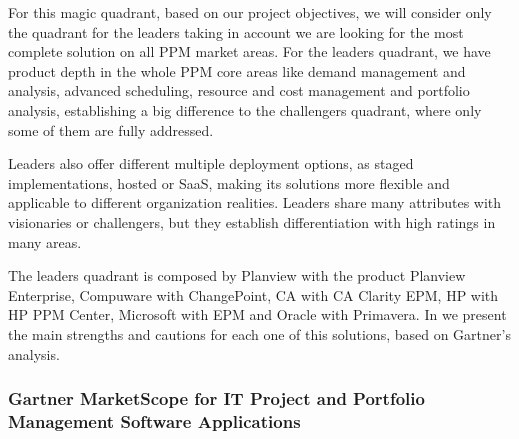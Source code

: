 For this magic quadrant, based on our project objectives, we will consider only the quadrant for the leaders taking in account we are looking for the most complete solution on all PPM market areas. For the leaders quadrant, we have product depth in the whole PPM core areas like demand management and analysis, advanced scheduling, resource and cost management and portfolio analysis, establishing a big difference to the challengers quadrant, where only some of them are fully addressed.\par
Leaders also offer different multiple deployment options, as staged implementations, hosted or SaaS, making its solutions more flexible and applicable to different organization realities. Leaders share many attributes with visionaries or challengers, but they establish differentiation with high ratings in many areas.\par
The leaders quadrant is composed by Planview with the product Planview Enterprise, Compuware with ChangePoint, CA with CA Clarity EPM, HP with HP PPM Center, Microsoft with EPM and Oracle with Primavera. In \cite{magicQuadrantPPM} we present the main strengths and cautions for each one of this solutions, based on Gartner's analysis.


\subsubsection{Gartner MarketScope for IT Project and Portfolio Management Software Applications}

